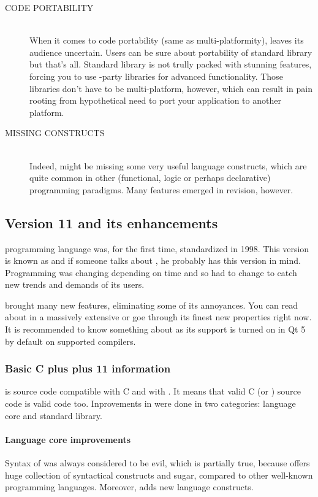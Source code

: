 \begin{description}
\item[CODE PORTABILITY\ts{\textcolor{red}{bad}}]\hfill \\
When it comes to code portability (same as multi-platformity), \cpp leaves its audience uncertain. Users can be sure about portability of \cpp standard library but that's all. Standard library is not trully packed with stunning features, forcing you to use -party libraries for advanced functionality. Those libraries don't have to be multi-platform, however, which can result in pain rooting from hypothetical need to port your application to another platform.

\item[MISSING CONSTRUCTS\ts{\textcolor{red}{bad}}]\hfill \\
Indeed, \cpp might be missing some very useful language constructs, which are quite common in other (\eg functional, logic or perhaps declarative) programming paradigms. Many features emerged in  revision, however.
\end{description}

\vfill

\subsection{Version 11 and its enhancements}
\cpp programming language was, for the first time, standardized in 1998. This version is known as  and if someone talks about \cpp, he probably has this version in mind. Programming was changing depending on time and so \cpp had to change to catch new trends and demands of its users.

 brought many new features, eliminating some of its annoyances. You can read about  in a massively extensive \citep{various:cppstandard} or goe through its finest new properties right now. It is recommended to know something about  as its support is turned on in Qt 5 by default on supported compilers.

\subsubsection{Basic C plus plus 11 information}
 is source code compatible with C and with . It means that valid C (or ) source code is valid  code too. Inprovements in \cpp were done in two categories: language core and standard library.

\paragraph{Language core improvements}
Syntax of \cpp was always considered to be evil, which is partially true, because \cpp offers huge collection of syntactical constructs and sugar, compared to other well-known programming languages. Moreover,  adds new language constructs.

